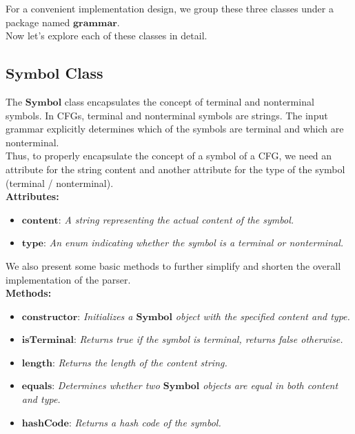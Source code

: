 For a convenient implementation design, we group these three classes under a package named \(\boldsymbol{grammar}\).\\

Now let’s explore each of these classes in detail.

\subsection{\(\boldsymbol{Symbol}\) Class}

The \(\boldsymbol{Symbol}\) class encapsulates the concept of terminal and nonterminal symbols. In CFGs, terminal and nonterminal symbols are strings. The input grammar explicitly determines which of the symbols are terminal and which are nonterminal.\\
Thus, to properly encapsulate the concept of a symbol of a CFG, we need an attribute for the string content and another attribute for the type of the symbol (terminal / nonterminal).\\

\textbf{Attributes:}
\begin{itemize}
    \item \(\boldsymbol{content}\): \textit{A string representing the actual content of the symbol.}
    \item \(\boldsymbol{type}\): \textit{An enum indicating whether the symbol is a terminal or nonterminal.}
\end{itemize}

We also present some basic methods to further simplify and shorten the overall implementation of the parser.\\

\textbf{Methods:}
\begin{itemize}
    \item \(\boldsymbol{constructor}\): \textit{Initializes a \(\boldsymbol{Symbol}\) object with the specified content and type.}
    \item \(\boldsymbol{isTerminal}\): \textit{Returns true if the symbol is terminal, returns false otherwise.}
    \item \(\boldsymbol{length}\): \textit{Returns the length of the content string.}
    \item \(\boldsymbol{equals}\): \textit{Determines whether two \(\boldsymbol{Symbol}\) objects are equal in both content and type.}
    \item \(\boldsymbol{hashCode}\): \textit{Returns a hash code of the symbol.}
\end{itemize}


